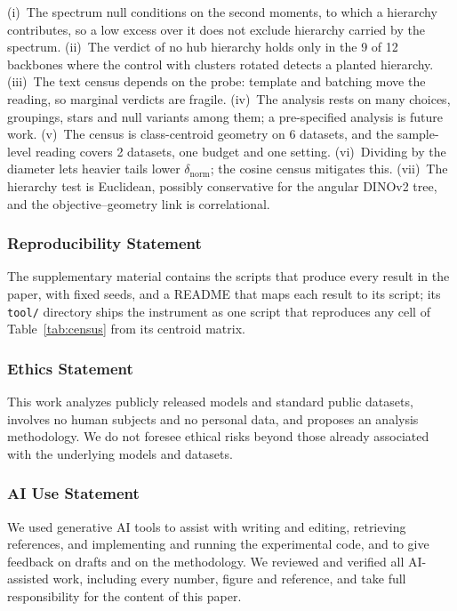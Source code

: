 \documentclass{article}
\makeatletter
\theoremstyle{inline}
\theoremstyle{inlineit}
\renewcommand\paragraph{\@startsection{paragraph}{4}{\z@}{0ex plus 0.3ex minus .2ex}{-1em}{\normalsize\bf}}\makeatother
\makeatother
\begin{document}
\paragraph{Limitations.} (i)~The spectrum null conditions on the second moments, to which a hierarchy contributes, so a low excess over it does not exclude hierarchy carried by the spectrum. (ii)~The verdict of no hub hierarchy holds only in the 9 of 12 backbones where the control with clusters rotated detects a planted hierarchy. (iii)~The text census depends on the probe: template and batching move the reading, so marginal verdicts are fragile. (iv)~The analysis rests on many choices, groupings, stars and null variants among them; a pre-specified analysis is future work. (v)~The census is class-centroid geometry on 6 datasets, and the sample-level reading covers 2 datasets, one budget and one setting. (vi)~Dividing by the diameter lets heavier tails lower $\delta_{\text{norm}}$; the cosine census mitigates this. (vii)~The hierarchy test is Euclidean, possibly conservative for the angular DINOv2 tree, and the objective--geometry link is correlational. %

\subsubsection*{Reproducibility Statement}
The supplementary material contains the scripts that produce every result in the paper, with fixed seeds, and a README that maps each result to its script; its \texttt{tool/} directory ships the instrument as one script that reproduces any cell of Table~\ref{tab:census} from its centroid matrix.

\subsubsection*{Ethics Statement}
This work analyzes publicly released models and standard public datasets, involves no human subjects and no personal data, and proposes an analysis methodology. We do not foresee ethical risks beyond those already associated with the underlying models and datasets.

\subsubsection*{AI Use Statement}
We used generative AI tools to assist with writing and editing, retrieving references, and implementing and running the experimental code, and to give feedback on drafts and on the methodology. We reviewed and verified all AI-assisted work, including every number, figure and reference, and take full responsibility for the content of this paper.
\end{document}
